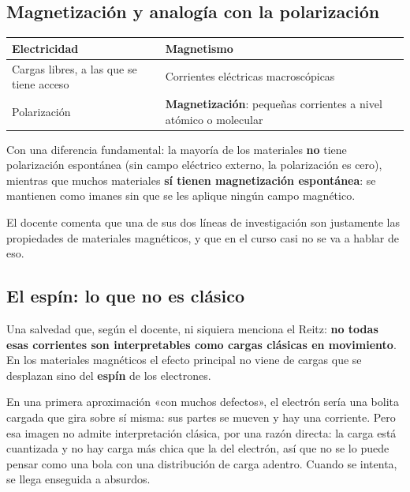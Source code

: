 \documentclass[12pt,a4paper]{article}
\begin{document}
\subsection{Magnetización y analogía con la polarización}

\begin{center}
\renewcommand{\arraystretch}{1.35}
\small
\begin{tabularx}{\textwidth}{>{\raggedright\arraybackslash}X>{\raggedright\arraybackslash}X}
\toprule
\textbf{Electricidad} & \textbf{Magnetismo} \\
\midrule
Cargas libres, a las que se tiene acceso & Corrientes eléctricas macroscópicas \\
Polarización & \textbf{Magnetización}: pequeñas corrientes a nivel atómico o molecular \\
\bottomrule
\end{tabularx}
\end{center}

Con una diferencia fundamental: la mayoría de los materiales \textbf{no} tiene
polarización espontánea (sin campo eléctrico externo, la polarización es cero),
mientras que muchos materiales \textbf{sí tienen magnetización espontánea}: se
mantienen como imanes sin que se les aplique ningún campo magnético.

\begin{notebox}
El docente comenta que una de sus dos líneas de investigación son justamente
las propiedades de materiales magnéticos, y que en el curso casi no se va a
hablar de eso.
\end{notebox}

\subsection{El espín: lo que no es clásico}

Una salvedad que, según el docente, ni siquiera menciona el Reitz: \textbf{no todas
esas corrientes son interpretables como cargas clásicas en movimiento}. En los
materiales magnéticos el efecto principal no viene de cargas que se desplazan
sino del \textbf{espín} de los electrones.

En una primera aproximación «con muchos defectos», el electrón sería una bolita
cargada que gira sobre sí misma: sus partes se mueven y hay una corriente. Pero
esa imagen no admite interpretación clásica, por una razón directa: la carga
está cuantizada y no hay carga más chica que la del electrón, así que no se lo
puede pensar como una bola con una distribución de carga adentro. Cuando se
intenta, se llega enseguida a absurdos.
\end{document}
